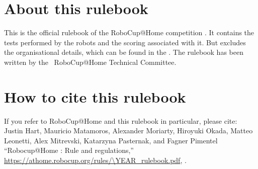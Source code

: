 


\section*{About this rulebook}
This is the official rulebook of the RoboCup@Home competition \YEAR. It contains the tests performed by the robots and the scoring associated with it. But excludes the organisational details, which can be found in the \Organisation.
The rulebook has been written by the \YEAR ~RoboCup@Home Technical Committee.



\section*{How to cite this rulebook}
If you refer to RoboCup@Home and this rulebook in particular, please cite:\\

\noindent Justin Hart, Mauricio Matamoros, Alexander Moriarty, Hiroyuki Okada,
Matteo Leonetti, Alex Mitrevski, Katarzyna Pasternak, and Fagner Pimentel
\enquote{Robocup@Home \YEAR: Rule and regulations,}
\url{https://athome.robocup.org/rules/\YEAR_rulebook.pdf}, \YEAR.

\begin{center}
	\begin{minipage}{0.8\textwidth}
		\footnotesize%
		
	\end{minipage}
\end{center}

